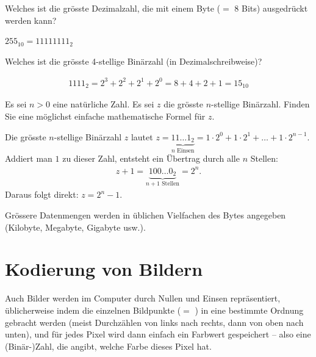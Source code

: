 \begin{myexercise}
	\label{ex:byte-max}
	Welches ist die grösste Dezimalzahl, die mit einem Byte ($=$ 8 Bits) ausgedrückt werden kann?
	\begin{myanswer}
		$255_{10} = 11111111_2$
	\end{myanswer}
\end{myexercise}

\begin{myexercise}
	Welches ist die grösste 4-stellige Binärzahl (in Dezimalschreibweise)?
	\begin{myanswer}
		\begin{align*}
			1111_2 = 2^3 + 2^2 + 2^1 + 2^0 = 8 + 4 + 2 + 1 = 15_{10}
		\end{align*}
	\end{myanswer}
\end{myexercise}

\begin{mychallenge}
	Es sei $n>0$ eine natürliche Zahl. Es sei $z$ die grösste $n$-stellige Binärzahl. Finden Sie eine möglichst einfache mathematische Formel für $z$.
	\begin{myanswer}
		Die grösste $n$-stellige Binärzahl $z$ lautet $z = \underbrace{11\dots 1_2}_{n\text{ Einsen}} = 1\cdot 2^0 + 1\cdot 2^1 + \dots + 1\cdot 2^{n-1}$.
		Addiert man $1$ zu dieser Zahl, entsteht ein Übertrag durch alle $n$ Stellen:
		\begin{align*}
			z + 1 = \underbrace{100\dots 0_2}_{n+1\text{ Stellen}} = 2^n.
		\end{align*}
		Daraus folgt direkt: $z = 2^n - 1$.
	\end{myanswer}
\end{mychallenge}

Grössere Datenmengen werden in üblichen Vielfachen des Bytes angegeben (Kilobyte, Megabyte, Gigabyte usw.).

\section{Kodierung von Bildern}

Auch Bilder werden im Computer durch Nullen und Einsen repräsentiert, üblicherweise indem die einzelnen Bildpunkte ($=$ ) in eine bestimmte Ordnung gebracht werden (meist Durchzählen von links nach rechts, dann von oben nach unten), und für jedes Pixel wird dann einfach ein Farbwert gespeichert -- also eine (Binär-)Zahl, die angibt, welche Farbe dieses Pixel hat.

